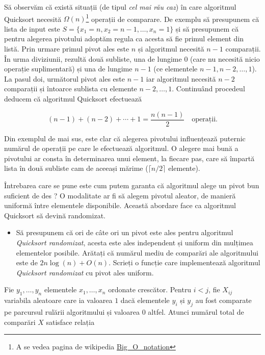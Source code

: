 \documentclass[]{article}
\let\rmarkdownfootnote\footnote%
\def\footnote{\protect\rmarkdownfootnote}
\newenvironment{frshaded*}{%
  \def\FrameCommand{\fboxrule=\FrameRule\fboxsep=\FrameSep \fcolorbox{framecolor}{shadecolor1}}%
  \MakeFramed {\advance\hsize-\width \FrameRestore}}%
{\endMakeFramed}
\newenvironment{rmdblock}[1]
  {\begin{frshaded*}
  \begin{itemize}
  \renewcommand{\labelitemi}{
    \raisebox{-.7\height}[0pt][0pt]{
      {\setkeys{Gin}{width=2em,keepaspectratio}\texttt{[image: images/icons/\#1]}}
    }
  }
  \item
  }
  {
  \end{itemize}
  \end{frshaded*}
  }
\newenvironment{rmdexercise}
  {\begin{rmdblock}{exercise}}
  {\end{rmdblock}}
\begin{document}
Să observăm că există situații (de tipul \emph{cel mai rău caz}) în care
algoritmul Quicksort necesită \(\Omega(n)\)\footnote{A se vedea pagina
  de wikipedia
  \href{https://en.wikipedia.org/wiki/Big_O_notation}{Big\_O\_notation}}
operații de comparare. De exemplu să presupunem că lista de input este
\(S = \{x_1=n,x_2=n-1,\ldots,x_n=1\}\) și să presupunem că pentru
alegerea pivotului adoptăm regula ca acesta să fie primul element din
listă. Prin urmare primul pivot ales este \(n\) și algoritmul necesită
\(n-1\) comparații. În urma diviziunii, rezultă două subliste, una de
lungime \(0\) (care nu necesită nicio operație suplimentară) și una de
lungime \(n-1\) (ce elementele \(n-1, n-2, \ldots, 1\)). La pasul doi,
următorul pivot ales este \(n-1\) iar algoritmul necesită \(n-2\)
comparații și întoarce sublista cu elemente \(n-2, \ldots, 1\).
Continuând procedeul deducem că algoritmul Quicksort efectuează

\[
  (n-1) + (n-2) + \cdots + 1 = \frac{n(n-1)}{2} \quad \text{operații}.
\]

Din exemplul de mai sus, este clar că alegerea pivotului influențează
puternic numărul de operații pe care le efectuează algoritmul. O alegere
mai bună a pivotului ar consta în determinarea unui element, la fiecare
pas, care să împartă lista în două subliste cam de aceeași mărime
(\(\lceil n/2\rceil\) elemente).

Întrebarea care se pune este cum putem garanta că algoritmul alege un
pivot bun suficient de des ? O modalitate ar fi să alegem pivotul
aleator, de manieră uniformă între elementele disponibile. Această
abordare face ca algoritmul Quicksort să devină randomizat.

\begin{rmdexercise}
Să presupunem că ori de câte ori un pivot este ales pentru algoritmul
\emph{Quicksort randomizat}, acesta este ales independent și uniform din
mulțimea elementelor posibile. Arătați că numărul mediu de comparări ale
algoritmului este de \(2n\log(n)+O(n)\). Scrieți o funcție care
implementează algoritmul \emph{Quicksort randomizat} cu pivot ales
uniform.
\end{rmdexercise}

Fie \(y_1,\ldots, y_n\) elementele \(x_1,\ldots, x_n\) ordonate
crescător. Pentru \(i<j\), fie \(X_{ij}\) variabila aleatoare care ia
valoarea \(1\) dacă elementele \(y_i\) și \(y_j\) au fost comparate pe
parcursul rulării algoritmului și valoarea \(0\) altfel. Atunci numărul
total de comparări \(X\) satisface relația
\end{document}
